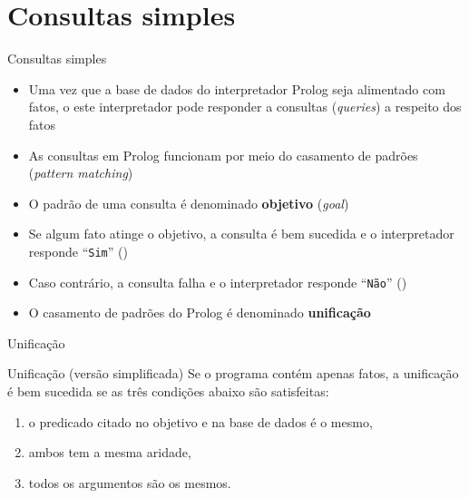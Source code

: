 \section{Consultas simples}

\begin{frame}[fragile]{Consultas simples}

    \begin{itemize}
        \item Uma vez que a base de dados do interpretador Prolog seja alimentado com fatos, o
            este interpretador pode responder a consultas (\textit{queries}) a respeito dos
            fatos

        \item As consultas em Prolog funcionam por meio do casamento de padrões
            (\textit{pattern matching})

        \item O padrão de uma consulta é denominado \textbf{objetivo} (\textit{goal})

        \item Se algum fato atinge o objetivo, a consulta é bem sucedida e o interpretador
            responde ``\texttt{Sim}'' ()

        \item Caso contrário, a consulta falha e o interpretador responde ``\texttt{Não}''
            ()

        \item O casamento de padrões do Prolog é denominado \textbf{unificação}

    \end{itemize}

\end{frame}

\begin{frame}[fragile]{Unificação}

    \begin{block}{Unificação (versão simplificada)}
        Se o programa contém apenas fatos, a unificação é bem sucedida se as três condições
            abaixo são satisfeitas:
        \begin{enumerate}
            \item o predicado citado no objetivo e na base de dados é o mesmo,
            \item ambos tem a mesma aridade,
            \item todos os argumentos são os mesmos.
        \end{enumerate}

    \end{block}

\end{frame}

